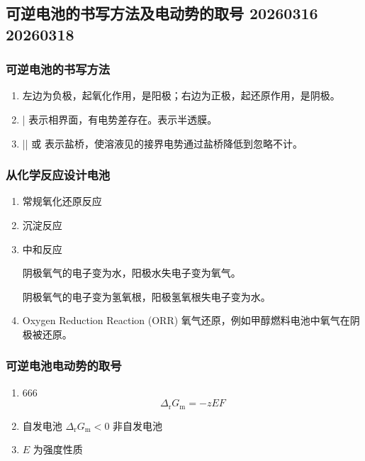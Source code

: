 \subsection{可逆电池的书写方法及电动势的取号 20260316 20260318}

\subsubsection{可逆电池的书写方法}

\begin{enumerate}
    \item 左边为负极，起氧化作用，是阳极；右边为正极，起还原作用，是阴极。
    \item | 表示相界面，有电势差存在。表示半透膜。%
    \item || 或 表示盐桥，使溶液见的接界电势通过盐桥降低到忽略不计。
\end{enumerate}

\subsubsection{从化学反应设计电池}

\begin{enumerate}
    \item 常规氧化还原反应
    \item 沉淀反应
    \item 中和反应 %
    


     阴极氧气的电子变为水，阳极水失电子变为氧气。

     阴极氧气的电子变为氢氧根，阳极氢氧根失电子变为水。

    \item Oxygen Reduction Reaction (ORR) 氧气还原，例如甲醇燃料电池中氧气在阴极被还原。
\end{enumerate}

\subsubsection{可逆电池电动势的取号}

\begin{enumerate}
    \item 666
    \begin{equation*}
        \Delta_{\mathrm{r}}G_{\mathrm{m}} = -zEF
    \end{equation*}
    \item 自发电池 $\Delta_{\mathrm{r}}G_{\mathrm{m}} < 0$ 非自发电池
    \item $E$ 为强度性质
\end{enumerate}

